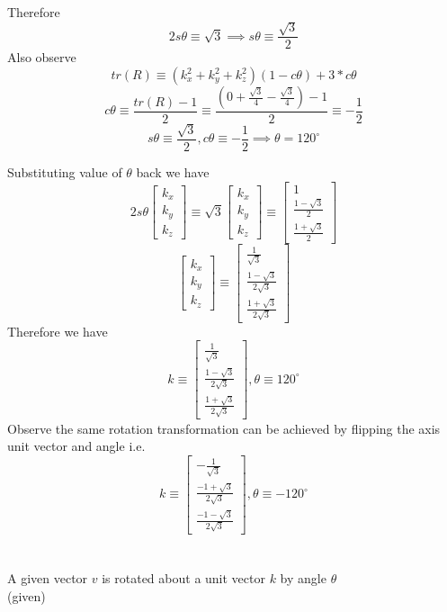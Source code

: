 \documentclass[12pt]{article}
\newcommand{\given}{{\\ \color{blue} \hspace*{\fill}(given)} \\}
\begin{document}
Therefore
\[
  2s\theta \equiv \sqrt{3} \implies
  s\theta \equiv \frac{\sqrt{3}}{2}
\]
Also observe
\[
  tr(R) \equiv (k_x^2 + k_y^2 + k_z^2) (1 - c\theta) + 3 * c\theta
\]
\[
  c\theta \equiv \frac{tr(R) - 1}{2} \equiv \frac{(0 + \frac{\sqrt{3}}{4} - \frac{\sqrt{3}}{4}) - 1}{2} \equiv -\frac{1}{2}
\]
\[
  s\theta \equiv \frac{\sqrt{3}}{2}, c\theta \equiv -\frac{1}{2} \implies \theta = 120^\circ
\]

Substituting value of $\theta$ back we have
\[
  2s\theta
  \begin{bmatrix}
    k_x\\
    k_y\\
    k_z
  \end{bmatrix}
  \equiv
  \sqrt{3}
  \begin{bmatrix}
    k_x\\
    k_y\\
    k_z
  \end{bmatrix}
  \equiv
  \begin{bmatrix} 1 \\ \frac{1 - \sqrt{3}}{2} \\ \frac{1 + \sqrt{3}}{2} \end{bmatrix}
\]
\[
  \begin{bmatrix}
    k_x\\
    k_y\\
    k_z
  \end{bmatrix}
  \equiv
  \begin{bmatrix} \frac{1}{\sqrt{3}} \\ \frac{1 - \sqrt{3}}{2\sqrt{3}} \\ \frac{1 + \sqrt{3}}{2\sqrt{3}} \end{bmatrix}
\]
Therefore we have
\[
  k \equiv
  \begin{bmatrix} \frac{1}{\sqrt{3}} \\ \frac{1 - \sqrt{3}}{2\sqrt{3}} \\ \frac{1 + \sqrt{3}}{2\sqrt{3}} \end{bmatrix},
  \theta \equiv 120^\circ
\]
Observe the same rotation transformation can be achieved by flipping the axis unit vector and angle i.e.
\[
  k \equiv
  \begin{bmatrix} -\frac{1}{\sqrt{3}} \\ \frac{-1 + \sqrt{3}}{2\sqrt{3}} \\ \frac{-1 - \sqrt{3}}{2\sqrt{3}} \end{bmatrix},
  \theta \equiv -120^\circ
\]
\pagebreak

\section{}
A given vector $v$ is rotated about a unit vector $k$ by angle $\theta$
\given
\end{document}
